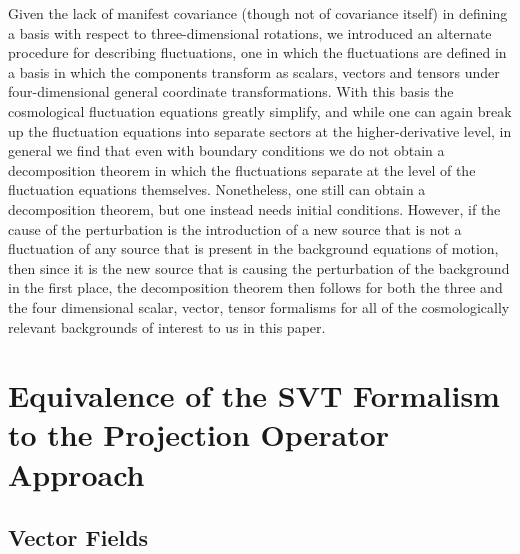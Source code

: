 \documentclass[aps,onecolumn,10pt]{revtex4}
\numberwithin{equation}{section}
\numberwithin{equation}{section}
\begin{document}
Given the lack of manifest covariance (though not of covariance itself) in defining a basis with respect to three-dimensional rotations, we introduced an alternate procedure for describing fluctuations, one in which the fluctuations are defined in a basis in which the components transform as scalars, vectors and tensors under four-dimensional general coordinate transformations. With this basis the cosmological fluctuation equations greatly simplify, and while one can again break up the fluctuation equations into separate sectors at the higher-derivative level, in general we find that even with boundary conditions we do not obtain a decomposition theorem in which the fluctuations separate at the level of the fluctuation equations themselves. Nonetheless, one still can obtain a decomposition theorem, but one instead needs initial conditions. However, if the cause of the perturbation is the introduction of a new source that is not a fluctuation of any source that is present in the background equations of motion, then since it is the new source that is causing the perturbation of the background in the first place, the decomposition theorem then follows for both the three and the four dimensional scalar, vector, tensor formalisms for all of the cosmologically relevant  backgrounds of interest to us in this paper. 

\appendix
{}
\setcounter{equation}{0}
\section{Equivalence of the SVT Formalism to the Projection Operator Approach}
\label{SA}

\subsection{Vector Fields}
\end{document}

